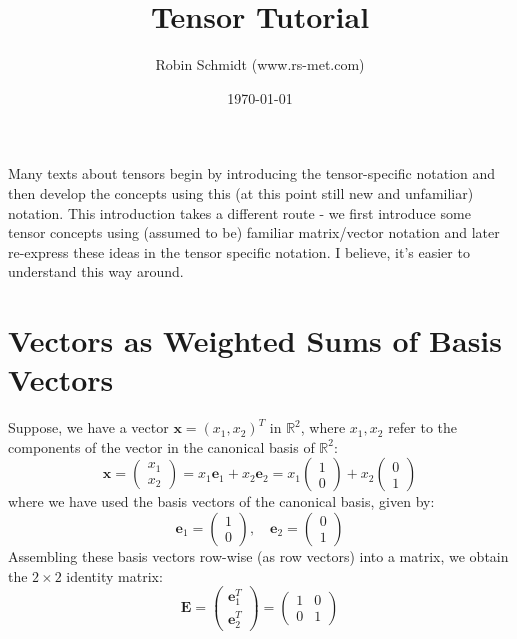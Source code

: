 \title{Tensor Tutorial}
\author{Robin Schmidt (www.rs-met.com)}
\date{\today}
\maketitle

Many texts about tensors begin by introducing the tensor-specific notation and then develop the concepts using this (at this point still new and unfamiliar) notation. This introduction takes a different route - we first introduce some tensor concepts using (assumed to be) familiar matrix/vector notation and later re-express these ideas in the tensor specific notation. I believe, it's easier to understand this way around.

\section{Vectors as Weighted Sums of Basis Vectors}
Suppose, we have a vector $\mathbf{x} = (x_1, x_2)^T$ in $\mathbb{R}^2$, where $x_1, x_2$ refer to the components of the vector in the canonical basis of $\mathbb{R}^2$:
\begin{equation}
 \mathbf{x} 
 =
 \begin{pmatrix} 
  x_1 \\
  x_2
 \end{pmatrix}
 =
 x_1 \mathbf{e}_1 + x_2 \mathbf{e}_2
 = 
 x_1  
 \begin{pmatrix} 
  1 \\
  0
 \end{pmatrix}
 +
 x_2  
 \begin{pmatrix} 
  0 \\
  1
 \end{pmatrix} 
\end{equation}
where we have used the basis vectors of the canonical basis, given by: 
\begin{equation}
 \mathbf{e}_1 
 =
 \begin{pmatrix} 
  1 \\
  0
 \end{pmatrix}, \quad
 \mathbf{e}_2 
 =
 \begin{pmatrix} 
  0 \\
  1
 \end{pmatrix} 
\end{equation}
Assembling these basis vectors row-wise (as row vectors) into a matrix, we obtain the $2 \times 2$ identity matrix:
\begin{equation}
 \mathbf{E}
 =
 \begin{pmatrix} 
  \mathbf{e}_1^T  \\
  \mathbf{e}_2^T 
 \end{pmatrix}
 =
 \begin{pmatrix} 
  1 & 0\\
  0 & 1
 \end{pmatrix} 
\end{equation}
